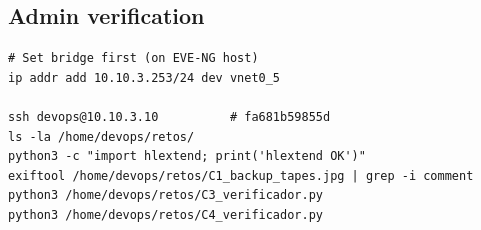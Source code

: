 \subsection{Admin verification}

\begin{lstlisting}
# Set bridge first (on EVE-NG host)
ip addr add 10.10.3.253/24 dev vnet0_5

ssh devops@10.10.3.10          # fa681b59855d
ls -la /home/devops/retos/
python3 -c "import hlextend; print('hlextend OK')"
exiftool /home/devops/retos/C1_backup_tapes.jpg | grep -i comment
python3 /home/devops/retos/C3_verificador.py
python3 /home/devops/retos/C4_verificador.py
\end{lstlisting}
